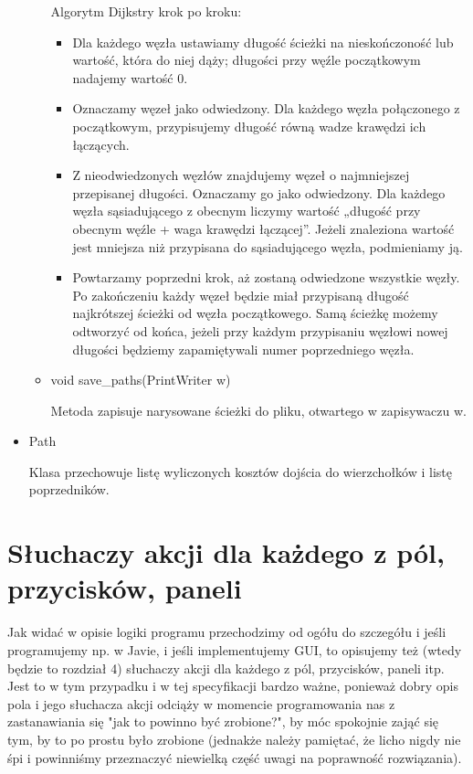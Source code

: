 \documentclass[]{article}
\begin{document}
\begin{itemize}
\begin{itemize}
        Algorytm Dijkstry krok po kroku:
        \begin{itemize}
            \item Dla każdego węzła ustawiamy długość ścieżki na nieskończoność lub wartość, która do niej dąży; długości przy węźle początkowym nadajemy wartość 0. 
            \item Oznaczamy węzeł jako odwiedzony. Dla każdego węzła połączonego z początkowym, przypisujemy długość równą wadze krawędzi ich łączących.
            \item Z nieodwiedzonych węzłów znajdujemy węzeł o najmniejszej przepisanej długości. Oznaczamy go jako odwiedzony. Dla każdego węzła sąsiadującego z obecnym liczymy wartość „długość przy obecnym węźle + waga krawędzi łączącej”. Jeżeli znaleziona wartość jest mniejsza niż przypisana do sąsiadującego węzła, podmieniamy ją.
            \item Powtarzamy poprzedni krok, aż zostaną odwiedzone wszystkie węzły. Po zakończeniu każdy węzeł będzie miał przypisaną długość najkrótszej ścieżki od węzła początkowego. Samą ścieżkę możemy odtworzyć od końca, jeżeli przy każdym przypisaniu węzłowi nowej długości będziemy zapamiętywali numer poprzedniego węzła.
        \end{itemize}
        \item void save\_paths(PrintWriter w)
        
        Metoda zapisuje narysowane ścieżki do pliku, otwartego w zapisywaczu w.
    \end{itemize}
    \item Path
    
    Klasa przechowuje listę wyliczonych kosztów dojścia do wierzchołków i listę poprzedników.
\end{itemize}

\section{Słuchaczy akcji dla każdego z pól, przycisków, paneli}\label{header-n279}
 Jak widać w opisie logiki programu przechodzimy od ogółu do szczegółu i jeśli programujemy np. w Javie, i jeśli implementujemy GUI, to opisujemy też (wtedy będzie to rozdział 4) słuchaczy akcji dla każdego z pól, przycisków, paneli itp. Jest to w tym przypadku i w tej specyfikacji bardzo ważne, ponieważ dobry opis pola i jego słuchacza akcji odciąży w momencie programowania nas z zastanawiania się "jak to powinno być zrobione?", by móc spokojnie zająć się tym, by to po prostu było zrobione (jednakże należy pamiętać, że licho nigdy nie śpi i powinniśmy przeznaczyć niewielką część uwagi na poprawność rozwiązania).
\end{document}
